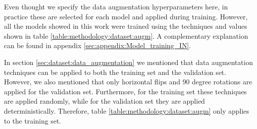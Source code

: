 Even thought we specify the data augmentation hyperparameters here, in practice these are selected for each model and applied during training. However, all the models showed in this work were trained using the techniques and values shown in table \ref{table:methodology:dataset:augm}. A complementary explanation can be found in appendix \ref{sec:appendix:Model_training_IN}.

In section \ref{sec:dataset:data_augmentation} we mentioned that data augmentation techniques can be applied to both the training set and the validation set. However, we also mentioned that only horizontal flips and 90 degree rotations are applied for the validation set. Furthermore, for the training set these techniques are applied randomly, while for the validation set they are applied deterministically. Therefore, table \ref{table:methodology:dataset:augm} only applies to the training set.
